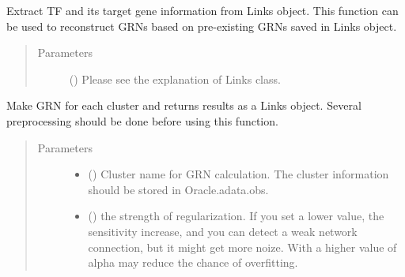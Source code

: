 \documentclass[letterpaper,10pt,english]{sphinxmanual}
\begin{document}
\begin{fulllineitems}
\begin{fulllineitems}
\end{fulllineitems}


\begin{fulllineitems}
\label{\detokenize{modules/celloracle:celloracle.Oracle.get_cluster_specific_TFdict_from_Links}}
Extract TF and its target gene information from Links object.
This function can be used to reconstruct GRNs based on pre-existing GRNs saved in Links object.
\begin{quote}\begin{description}
\item[{Parameters}] \leavevmode
{} ({\hyperref[\detokenize{modules/celloracle:celloracle.Links}]{}}) \textendash{} Please see the explanation of Links class.

\end{description}\end{quote}

\end{fulllineitems}


\begin{fulllineitems}
\label{\detokenize{modules/celloracle:celloracle.Oracle.get_links}}
Make GRN for each cluster and returns results as a Links object.
Several preprocessing should be done before using this function.
\begin{quote}\begin{description}
\item[{Parameters}] \leavevmode\begin{itemize}
\item {} 
 () \textendash{} Cluster name for GRN calculation. The cluster information should be stored in Oracle.adata.obs.

\item {} 
 () \textendash{} the strength of regularization.
If you set a lower value, the sensitivity increase, and you can detect a weak network connection, but it might get more noize.
With a higher value of alpha may reduce the chance of overfitting.


\end{itemize}
\end{description}
\end{quote}
\end{fulllineitems}
\end{fulllineitems}
\end{document}
